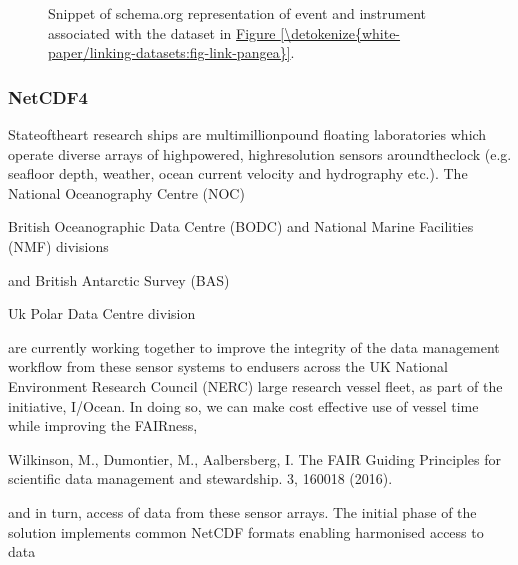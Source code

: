 \documentclass[a4paper,10pt,english]{sphinxmanual}
\begin{document}
\begin{figure}[htbp]
\centering
\capstart

\noindent{}
\caption{Snippet of schema.org representation of event and instrument
associated with the dataset in \hyperref[\detokenize{white-paper/linking-datasets:fig-link-pangea}]{Figure \ref{\detokenize{white-paper/linking-datasets:fig-link-pangea}}}.}\label{\detokenize{white-paper/linking-datasets:fig-link-schema-org}}\end{figure}


\subsubsection{NetCDF4}
\label{\detokenize{white-paper/linking-datasets:netcdf4}}\label{\detokenize{white-paper/linking-datasets:section-1}}
\sphinxAtStartPar
State\sphinxhyphen{}of\sphinxhyphen{}the\sphinxhyphen{}art research ships are multimillion\sphinxhyphen{}pound floating
laboratories which operate diverse arrays of high\sphinxhyphen{}powered,
high\sphinxhyphen{}resolution sensors around\sphinxhyphen{}the\sphinxhyphen{}clock (e.g. sea\sphinxhyphen{}floor depth,
weather, ocean current velocity and hydrography etc.). The National
Oceanography Centre (NOC)%
\begin{footnote}[1]\sphinxAtStartFootnote
British Oceanographic Data Centre (BODC) and National Marine
Facilities (NMF) divisions
%
\end{footnote} and British Antarctic Survey
(BAS)%
\begin{footnote}[2]\sphinxAtStartFootnote
Uk Polar Data Centre division
%
\end{footnote} are currently working together to improve the
integrity of the data management workflow from these sensor systems to
end\sphinxhyphen{}users across the UK National Environment Research Council (NERC)
large research vessel fleet, as part of the initiative, I/Ocean. In
doing so, we can make cost effective use of vessel time while
improving the FAIRness,%
\begin{footnote}[3]\sphinxAtStartFootnote
Wilkinson, M., Dumontier, M., Aalbersberg, I.  The FAIR
Guiding Principles for scientific data management and stewardship.
 3, 160018 (2016). 
%
\end{footnote} and in turn, access of data
from these sensor arrays. The initial phase of the solution
implements common NetCDF formats enabling harmonised access to data
\end{document}

